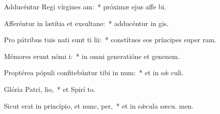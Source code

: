 \item Adducéntur Regi vírgines  am:~* próximæ ejus affe bi.
\item Afferéntur in lætítia et exsultane:~* adducéntur in  gis.
\item Pro pátribus tuis nati sunt ti lii:~* constítues eos príncipes super  ram.
\item Mémores erunt nómi i:~* in omni generatióne et genenem.
\item Proptérea pópuli confitebúntur tibi in num:~* et in sǽ culi.
\item Glória Patri,  lio,~* et Spirí to.
\item Sicut erat in princípio, et nunc,  per,~* et in sǽcula sæcu. men.
